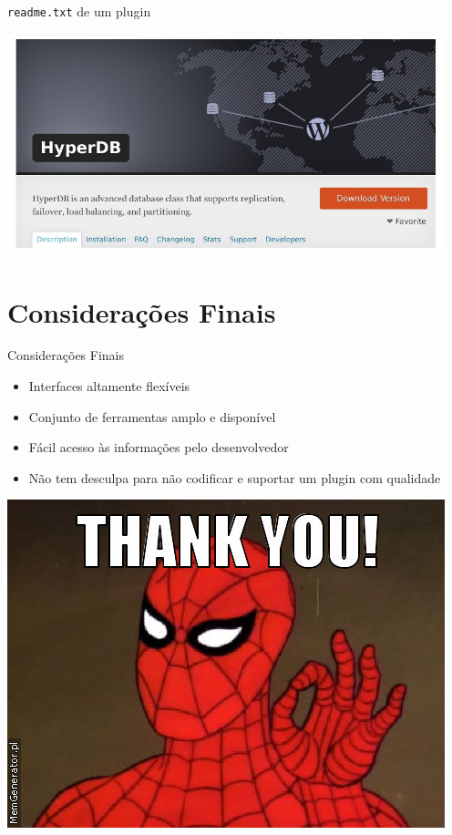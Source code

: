 \documentclass{beamer}
\begin{document}
\begin{frame}{\texttt{readme.txt} de um plugin}
  
\end{frame}

\begin{frame}
\begin{center}
  \includegraphics[width=0.95\textwidth]{./img/hyperdb-screen.jpg}
\end{center}
\end{frame}

\section{Considerações Finais}

\begin{frame}{Considerações Finais}
\begin{itemize}
  \pause \item Interfaces altamente flexíveis
  \pause \item Conjunto de ferramentas amplo e disponível
  \pause \item Fácil acesso às informações pelo desenvolvedor
  \pause \item Não tem desculpa para não codificar e suportar um
    plugin com qualidade
\end{itemize}
\end{frame}

\begin{frame}
\begin{center}
  \includegraphics[height=0.8\textheight]{./img/thank-you.jpg}
\end{center}
\end{frame}
\end{document}
